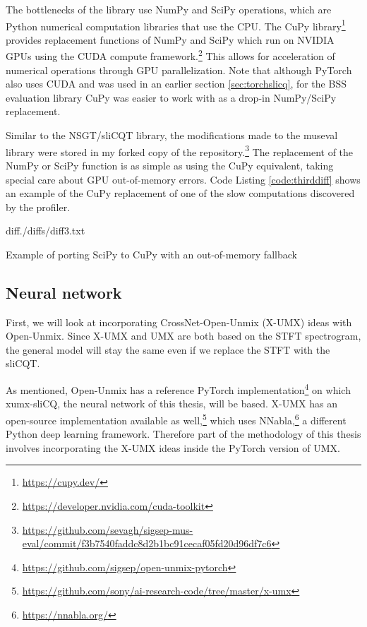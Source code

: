 \documentclass[report.tex]{subfiles}
\begin{document}
The bottlenecks of the library use NumPy and SciPy operations, which are Python numerical computation libraries that use the CPU. The CuPy library\footnote{\url{https://cupy.dev/}} provides replacement functions of NumPy and SciPy which run on NVIDIA GPUs using the CUDA compute framework.\footnote{\url{https://developer.nvidia.com/cuda-toolkit}} This allows for acceleration of numerical operations through GPU parallelization. Note that although PyTorch also uses CUDA and was used in an earlier section \ref{sec:torchslicq}, for the BSS evaluation library CuPy was easier to work with as a drop-in NumPy/SciPy replacement.

Similar to the NSGT/sliCQT library, the modifications made to the museval library were stored in my forked copy of the repository.\footnote{\url{https://github.com/sevagh/sigsep-mus-eval/commit/f3b7540faddc8d2b1bc91cecaf05fd20d96df7c6}} The replacement of the NumPy or SciPy function is as simple as using the CuPy equivalent, taking special care about GPU out-of-memory errors. Code Listing \ref{code:thirddiff} shows an example of the CuPy replacement of one of the slow computations discovered by the profiler.

\begin{listing}[ht]
  \centering
\begin{inputminted}[linenos,breaklines,frame=single,fontsize=\scriptsize]{diff}{./diffs/diff3.txt}
\end{inputminted}
  \caption{Example of porting SciPy to CuPy with an out-of-memory fallback}
  \label{code:thirddiff}
\end{listing}

\newpagefill

\subsection{Neural network}
\label{sec:neuralnet}

First, we will look at incorporating CrossNet-Open-Unmix (X-UMX) ideas with Open-Unmix. Since X-UMX and UMX are both based on the STFT spectrogram, the general model will stay the same even if we replace the STFT with the sliCQT.

As mentioned, Open-Unmix has a reference PyTorch implementation\footnote{\url{https://github.com/sigsep/open-unmix-pytorch}} on which xumx-sliCQ, the neural network of this thesis, will be based. X-UMX has an open-source implementation available as well,\footnote{\url{https://github.com/sony/ai-research-code/tree/master/x-umx}} which uses NNabla,\footnote{\url{https://nnabla.org/}} a different Python deep learning framework. Therefore part of the methodology of this thesis involves incorporating the X-UMX ideas inside the PyTorch version of UMX.
\end{document}
